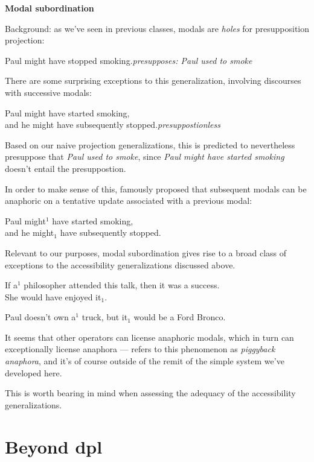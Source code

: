 \documentclass[nols,twoside,nofonts,nobib,nohyper]{tufte-handout}
\theoremstyle{observation}
\theoremstyle{theorem}
\theoremstyle{corollary}
\theoremstyle{definition}
\begin{document}
  \textbf{Modal subordination}

  Background: as we've seen in previous classes, modals are \textit{holes} for presupposition projection:

  \ex
  Paul might have stopped smoking.\hfill\textit{presupposes: Paul used to smoke}
  \xe

  There are some surprising exceptions to this generalization, involving discourses with successive modals:

  \ex
  Paul might have started smoking,\\
  and he might have subsequently stopped.\hfill\textit{presuppostionless}
  \xe

  Based on our naive projection generalizations, this is predicted to nevertheless presuppose that \textit{Paul used to smoke}, since \textit{Paul might have started smoking} doesn't entail the presuppostion.

  In order to make sense of this, \citet{Roberts1989} famously proposed that subsequent modals can be anaphoric on a tentative update associated with a previous modal:

  \ex
  Paul might$^{1}$ have started smoking,\\
  and he might$_{1}$ have subsequently stopped.
  \xe

  Relevant to our purposes, modal subordination gives rise to a broad class of exceptions to the accessibility generalizations discussed above.

  \ex
  If a$^{1}$ philosopher attended this talk, then it was a success.\\
  She would have enjoyed it$_{1}$.
  \xe

  \ex
  Paul doesn't own a$^{1}$ truck, but it$_{1}$ would be a Ford Bronco.
  \xe

  It seems that other operators can license anaphoric modals, which in turn can exceptionally license anaphora --- \citet{Geurts2019} refers to this phenomenon as \textit{piggyback anaphora}, and it's of course outside of the remit of the simple system we've developed here.

  This is worth bearing in mind when assessing the adequacy of the accessibility generalizations.

\section{Beyond \ac{dpl}}
\end{document}
